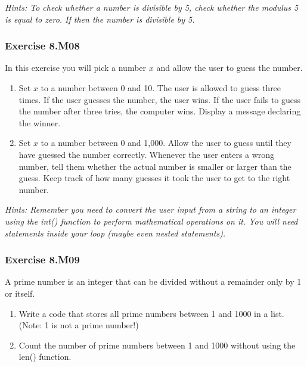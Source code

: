 \textit{Hints:
To check whether a number is divisible by 5, check whether the modulus 5 is equal to zero. If
{} then the number is divisible by 5.}\\[1cm]



\subsubsection*{Exercise 8.M08}
In this exercise you will pick a number $x$ and allow the user to guess the number.
\begin{enumerate}[label=(\alph*)]
	\item Set $x$ to a number between 0 and 10. The user is allowed to guess three times. If the user guesses the number, the user wins. If the user fails to guess the number after
three tries, the computer wins. Display a message declaring the winner.
	\item Set $x$ to a number between 0 and 1,000. Allow the user to guess until they have
guessed the number correctly. Whenever the user enters a wrong number, tell them
whether the actual number is smaller or larger than the guess. Keep track of how
many guesses it took the user to get to the right number.
\end{enumerate}

\textit{Hints:
Remember you need to convert the user input from a string to an integer using the int()
function to perform mathematical operations on it. You will need {}
statements inside your loop (maybe even nested {} statements).}\\[1cm]



\subsubsection*{Exercise 8.M09 \red{[M]}}
A prime number is an integer that can be divided without a remainder only by 1 or itself.
\begin{enumerate}[label=(\alph*)]
	\item Write a code that stores all prime numbers between 1 and 1000 in a list. (Note: 1 is not a prime number!)
	\item Count the number of prime numbers between 1 and 1000 without using the len()
function.
\end{enumerate}

